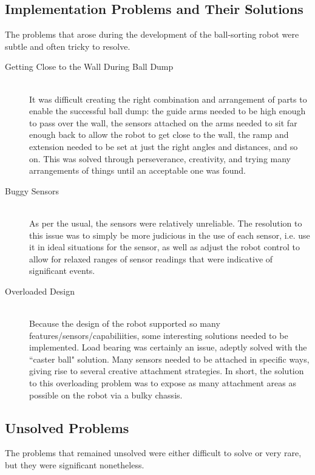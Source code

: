 \documentclass{article}
\begin{document}
\subsection{Implementation Problems and Their Solutions}
The problems that arose during the development of the ball-sorting robot were subtle and often tricky to resolve.

\begin{description}
  \item[Getting Close to the Wall During Ball Dump] \hfill \\
  It was difficult creating the right combination and arrangement of parts to enable the successful ball dump: the guide arms needed to be high enough to pass over the wall, the sensors attached on the arms needed to sit far enough back to allow the robot to get close to the wall, the ramp and extension needed to be set at just the right angles and distances, and so on. This was solved through perseverance, creativity, and trying many arrangements of things until an acceptable one was found.

  \item[Buggy Sensors] \hfill \\
  As per the usual, the sensors were relatively unreliable. The resolution to this issue was to simply be more judicious in the use of each sensor, i.e. use it in ideal situations for the sensor, as well as adjust the robot control to allow for relaxed ranges of sensor readings that were indicative of significant events.

  \item[Overloaded Design] \hfill \\
  Because the design of the robot supported so many features/sensors/capabiliities, some interesting solutions needed to be implemented. Load bearing was certainly an issue, adeptly solved with the ``caster ball" solution. Many sensors needed to be attached in specific ways, giving rise to several creative attachment strategies. In short, the solution to this overloading problem was to expose as many attachment areas as possible on the robot via a bulky chassis.
\end{description}

\subsection{Unsolved Problems}
The problems that remained unsolved were either difficult to solve or very rare, but they were significant nonetheless.
\end{document}
